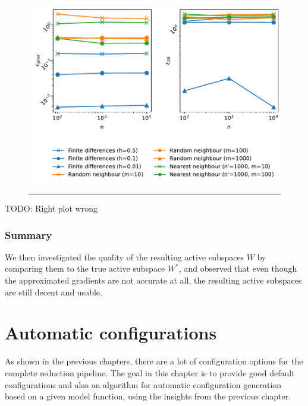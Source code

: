 \documentclass[
  a4paper,  %
  twoside,  %
  bibliography=totoc,
  headsepline,
  cleardoublepage=empty,
  parskip=half,
  draft=false
]{scrbook}
\newcommand{\delimit}{{\color{charcoal}\noindent\rule{\textwidth}{1pt}}}
\begin{document}
\begin{mdframed}[style=style]
\begin{figure}[H]
\centering
	\includegraphics[width=\textwidth]{graphics/as_errors_f2}
	
\delimit
	\label{fig:as_grad_errors_f2}
\end{figure}
\end{mdframed}

TODO: Right plot wrong

\subsection{Summary}

We then investigated the quality of the resulting active subspaces $W$ by comparing them to the true active subspace $W^\ast$, and observed that even though the approximated gradients are not accurate at all, the resulting active subspaces are still decent and usable.


\chapter{Automatic configurations}
\label{chap:c8}

As shown in the previous chapters, there are a lot of configuration options for the complete reduction pipeline.
The goal in this chapter is to provide good default configurations and also an algorithm for automatic configuration generation based on a given model function, using the insights from the previous chapter.
\end{document}
